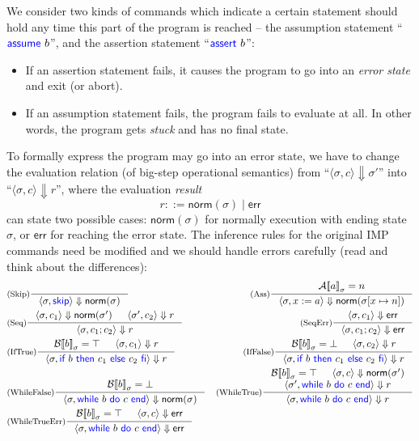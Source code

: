 \documentclass[11pt,a4paper]{article}
\newcommand{\pair}[1]{\langle #1 \rangle}
\newcommand{\evalA}[2]{{\mathcal{A}\llbracket #1 \rrbracket}_{#2}}
\newcommand{\evalB}[2]{{\mathcal{B}\llbracket #1 \rrbracket}_{#2}}
\newcommand{\evalC}[3]{\pair{#1, #2} \Downarrow #3}
\newcommand{\norm}[1]{\textsf{norm}(#1)}
\newcommand{\err}{\textsf{err}}
\newcommand{\kword}[1]{{\color{blue} \textsf{#1}}}
\newcommand{\Skip}{\kword{skip}}
\newcommand{\If}{\kword{if}}
\newcommand{\Then}{\kword{then}}
\newcommand{\Else}{\kword{else}}
\newcommand{\Fi}{\kword{fi}}
\newcommand{\While}{\kword{while}}
\newcommand{\Do}{\kword{do}}
\newcommand{\End}{\kword{end}}
\newcommand{\Assume}{\kword{assume}}
\newcommand{\Assert}{\kword{assert}}
\begin{document}
We consider two kinds of commands which indicate a certain statement should hold any time this part of the program is reached -- the assumption statement ``$\Assume~b$'', and the assertion statement ``$\Assert~b$'':
\begin{itemize}
	\item If an assertion statement fails, it causes the program to go into an \emph{error state} and exit (or abort).
	\item If an assumption statement fails, the program fails to evaluate at all.
	In other words, the program gets \emph{stuck} and has no final state.
\end{itemize}
To formally express the program may go into an error state, we have to change the evaluation relation (of big-step operational semantics) from ``$\evalC{\sigma}{c}{\sigma'}$'' into ``$\evalC{\sigma}{c}{r}$'', where the evaluation \emph{result}
$$r ::= \norm{\sigma} \mid \err$$
can state two possible cases: $\norm{\sigma}$ for normally execution with ending state $\sigma$,
or $\err$ for reaching the error state.
The inference rules for the original IMP commands need be modified and we should handle errors carefully (read and think about the differences):
\begin{align*}
	&\inference[(Skip)]{}{\evalC{\sigma}{\Skip}{\norm{\sigma}}}
	&\inference[(Ass)]{\evalA{a}{\sigma}=n}{\evalC{\sigma}{x:=a}{\norm{\sigma[x\mapsto n]}}} \\
	&\inference[(Seq)]{\evalC{\sigma}{c_1}{\norm{\sigma'}} & \evalC{\sigma'}{c_2}{r}}
		{\evalC{\sigma}{c_1;c_2}{r}}
	&\inference[(SeqErr)]{\evalC{\sigma}{c_1}{\err}}{\evalC{\sigma}{c_1;c_2}{\err}} \\
	&\inference[(IfTrue)]{\evalB{b}{\sigma}=\top & \evalC{\sigma}{c_1}{r}}
		{\evalC{\sigma}{\If~b~\Then~c_1~\Else~c_2~\Fi}{r}}
	&\inference[(IfFalse)]{\evalB{b}{\sigma}=\bot & \evalC{\sigma}{c_2}{r}}
		{\evalC{\sigma}{\If~b~\Then~c_1~\Else~c_2~\Fi}{r}} \\
	&\inference[(WhileFalse)]{\evalB{b}{\sigma}=\bot}
		{\evalC{\sigma}{\While~b~\Do~c~\End}{\norm{\sigma}}}
	&\inference[(WhileTrue)]{\evalB{b}{\sigma}=\top & \evalC{\sigma}{c}{\norm{\sigma'}} \\
		\evalC{\sigma'}{\While~b~\Do~c~\End}{r}}{\evalC{\sigma}{\While~b~\Do~c~\End}{r}} \\
	&\inference[(WhileTrueErr)]{\evalB{b}{\sigma}=\top & \evalC{\sigma}{c}{\err}}
		{\evalC{\sigma}{\While~b~\Do~c~\End}{\err}} \\
\end{align*}
\end{document}
